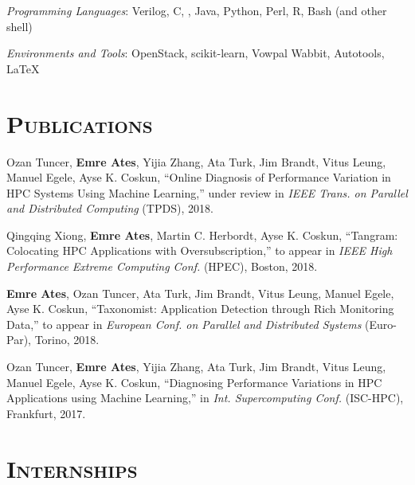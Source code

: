 \begin{resume}
	\emph{Programming Languages}: Verilog, C, \Cplusplus, Java, Python, Perl, R,
  Bash (and other shell)
	\setlength{\parskip}{1mm}
	
	\emph{Environments and Tools}: OpenStack, scikit-learn, Vowpal Wabbit, Autotools, \LaTeX
	
	
	

  \section{\textsc{Publications}}
  Ozan Tuncer, \textbf{Emre Ates}, Yijia Zhang, Ata Turk, Jim Brandt, Vitus
  Leung, Manuel Egele, Ayse K. Coskun, ``Online Diagnosis of Performance
  Variation in HPC Systems Using Machine Learning,'' under review in
  \textit{IEEE Trans. on Parallel and Distributed Computing} (TPDS), 2018.

\vspace{0.1in}
  Qingqing Xiong, \textbf{Emre Ates}, Martin C. Herbordt, Ayse K. Coskun,
  ``Tangram: Colocating HPC Applications with Oversubscription,'' to appear in
  \textit{IEEE High Performance Extreme Computing Conf.} (HPEC), Boston, 2018.

\vspace{0.1in}
  \textbf{Emre Ates}, Ozan Tuncer, Ata Turk, Jim Brandt, Vitus Leung, Manuel
  Egele, Ayse K. Coskun, ``Taxonomist: Application Detection through Rich
  Monitoring Data,'' to appear in \textit{European Conf. on Parallel and
    Distributed Systems} (Euro-Par), Torino, 2018.

\vspace{0.1in}
  Ozan Tuncer, \textbf{Emre Ates}, Yijia Zhang, Ata Turk, Jim Brandt, Vitus
  Leung, Manuel Egele, Ayse K. Coskun, ``Diagnosing Performance Variations in
  HPC Applications using Machine Learning,'' in \textit{Int. Supercomputing
    Conf.} (ISC-HPC), Frankfurt, 2017.
	
	\section{\textsc{Internships}}

	\begin{formatb}
		\\
		\body\\
	\end{formatb}
	

\end{resume}
